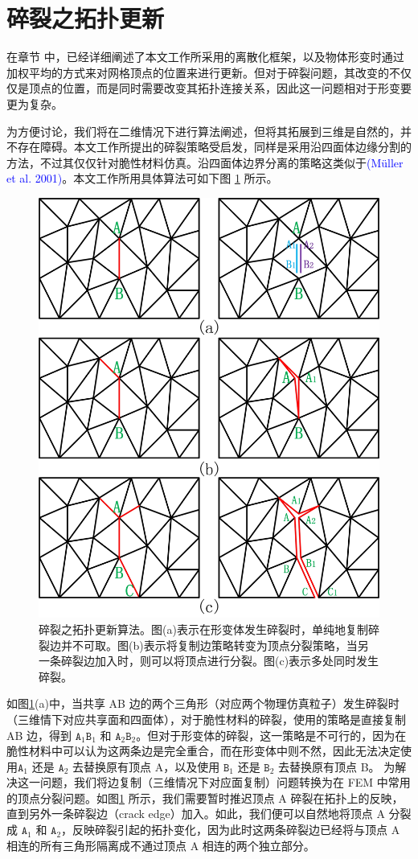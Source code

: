 \section{碎裂之拓扑更新}
在章节 \label{discretization} 中，已经详细阐述了本文工作所采用的离散化框架，以及物体形变时通过加权平均的方式来对网格顶点的位置来进行更新。但对于碎裂问题，其改变的不仅仅是顶点的位置，而是同时需要改变其拓扑连接关系，因此这一问题相对于形变要更为复杂。

为方便讨论，我们将在二维情况下进行算法阐述，但将其拓展到三维是自然的，并不存在障碍。本文工作所提出的碎裂策略受启发，同样是采用沿四面体边缘分割的方法，不过其仅仅针对脆性材料仿真。沿四面体边界分离的策略这类似于\textcolor{blue}{(M\"{u}ller et al. 2001)\parencite{Muller2001}}。本文工作所用具体算法可如下图 \ref{topology_control} 所示。

\begin{figure}[!htb]
  \centering
  \captionsetup{justification=centering}
  \includegraphics[width=0.6\linewidth]{chap/image/topology_control}
  \caption{\label{topology_control}
           碎裂之拓扑更新算法。图(a)表示在形变体发生碎裂时，单纯地复制碎裂边并不可取。图(b)表示将复制边策略转变为顶点分裂策略，当另一条碎裂边加入时，则可以将顶点进行分裂。图(c)表示多处同时发生碎裂。
          }
\end{figure}

如图\ref{topology_control}(a)中，当共享 AB 边的两个三角形（对应两个物理仿真粒子）发生碎裂时（三维情下对应共享面和四面体），对于脆性材料的碎裂，使用的策略是直接复制 AB 边，得到 $\texttt{A}_1\texttt{B}_1$ 和 $\texttt{A}_2\texttt{B}_2$。但对于形变体的碎裂，这一策略是不可行的，因为在脆性材料中可以认为这两条边是完全重合，而在形变体中则不然，因此无法决定使用$\texttt{A}_1$ 还是 $\texttt{A}_2$ 去替换原有顶点 A，以及使用 $\texttt{B}_1$ 还是 $\texttt{B}_2$ 去替换原有顶点 B。 为解决这一问题，我们将边复制（三维情况下对应面复制）问题转换为在 FEM 中常用的顶点分裂问题。如图\ref{topology_control} 所示，我们需要暂时推迟顶点 A 碎裂在拓扑上的反映，直到另外一条碎裂边（crack edge）加入。如此，我们便可以自然地将顶点 A 分裂成 $\texttt{A}_1$ 和 $\texttt{A}_2$，反映碎裂引起的拓扑变化，因为此时这两条碎裂边已经将与顶点 A 相连的所有三角形隔离成不通过顶点 A 相连的两个独立部分。

